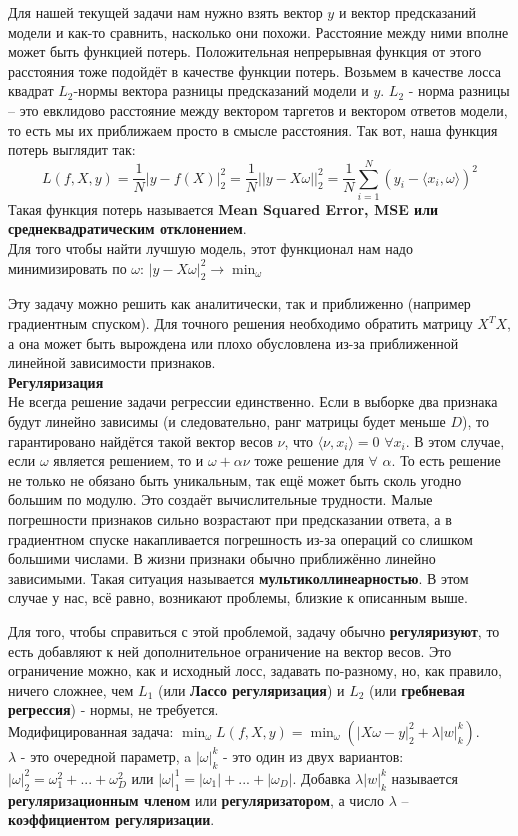 Для нашей текущей задачи нам нужно взять вектор $y$ и вектор предсказаний модели и как-то сравнить, насколько они похожи. Расстояние между ними вполне может быть функцией потерь. Положительная непрерывная функция от этого расстояния тоже подойдёт в качестве функции потерь. Возьмем в качестве лосса квадрат $L_2$-нормы вектора разницы предсказаний модели и $y$. $L_2$ - норма разницы – это евклидово расстояние между вектором таргетов и вектором ответов модели, то есть мы их приближаем просто в смысле расстояния.
Так вот, наша функция потерь выглядит так:
\begin{equation*}
    L(f,X,y)=\frac{1}{N}|y-f(X)|_2^2=\frac{1}{N}||y-X\omega||_2^2 =\frac{1}{N}\sum_{i=1}^{N} (y_i-\langle x_i,\omega\rangle)^2
\end{equation*}
Такая функция потерь называется \textbf{Mean Squared Error, MSE или среднеквадратическим отклонением}. \\
Для того чтобы найти лучшую модель, этот функционал нам надо минимизировать по $\omega$: $|y-X\omega|_2^2 \xrightarrow{} \min_{\omega}$

Эту задачу можно решить как аналитически, так и приближенно (например градиентным спуском).
Для точного решения необходимо обратить матрицу $X^TX$, а она может быть вырождена или плохо обусловлена из-за приближенной линейной зависимости признаков. \\
\textbf{Регуляризация} \\
Не всегда решение задачи регрессии единственно. Если в выборке два признака будут линейно зависимы (и следовательно, ранг матрицы будет меньше $D$), то гарантировано найдётся такой вектор весов $\nu$, что $\langle\nu,x_i\rangle=0  
 $ $\forall x_i$. В этом случае, если $\omega$ является решением, то и $\omega+\alpha\nu$ тоже решение для $\forall$ $\alpha$. То есть решение не только не обязано быть уникальным, так ещё может быть сколь угодно большим по модулю. Это создаёт вычислительные трудности. Малые погрешности признаков сильно возрастают при предсказании ответа, а в градиентном спуске накапливается погрешность из-за операций со слишком большими числами. В жизни признаки обычно приближённо линейно зависимыми. Такая ситуация называется \textbf{мультиколлинеарностью}. В этом случае у нас, всё равно, возникают проблемы, близкие к описанным выше. 
\par Для того, чтобы справиться с этой проблемой, задачу обычно \textbf{регуляризуют}, то есть добавляют к ней дополнительное ограничение на вектор весов. Это ограничение можно, как и исходный лосс, задавать по-разному, но, как правило, ничего сложнее, чем $L_1$ (или \textbf{Лассо регуляризация}) и $L_2$ (или \textbf{гребневая регрессия}) - нормы, не требуется. \\
Модифицированная задача: $\min_{\omega}L(f, X, y) = \min_{\omega}(|X\omega-y|_2^2+\lambda|w|_k^k)$. \\
$\lambda$ - это очередной параметр, a $|\omega|_k^k$ - это один из двух вариантов:
$|\omega|_2^2=\omega_1^2+...+\omega_D^2$ или $ |\omega|_1^1=|\omega_1|+...+|\omega_D|$.
Добавка $\lambda|w|_k^k$ называется \textbf{регуляризационным членом} или \textbf{регуляризатором}, а число $\lambda$ – \textbf{коэффициентом регуляризации}.

